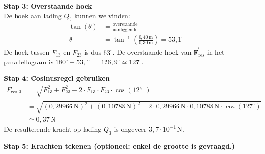 \documentclass{ximera}
\begin{document}
\begin{exercise}
\begin{solution}
\begin{center}
        \end{center}

    \textbf{Stap 3: Overstaande hoek}\\
        De hoek aan lading $Q_{3}$ kunnen we vinden:
        \begin{align*}
            \tan(\theta)&=\frac{\text{overstaande}}{\text{aanliggende}}\\
            \theta &=\tan^{-1}\left(\frac{0{,}40 \, \mathrm{m}}{0{,}30 \, \mathrm{m}}\right)= 53{,}1^\circ
        \end{align*}
        De hoek tussen $F_{13}$ en $F_{23}$ is dus $53^\circ$. De overstaande hoek van $\vec{\mathbf{F}}_{\text{res}}$ in het parallellogram is $180^\circ - 53{,}1^\circ = 126{,}9^\circ \simeq 127^\circ$.

    \textbf{Stap 4: Cosinusregel gebruiken}  
        \begin{align*}
            F_{\text{res},3} &= \sqrt{F_{13}^{2} + F_{23}^{2} - 2 \cdot F_{13} \cdot F_{23}\cdot \cos(127^\circ)}\\
            &= \sqrt{(0{,}29966 \, \mathrm{N})^{2}+(0{,}10788 \, \mathrm{N})^{2}-2\cdot 0{,}29966 \, \mathrm{N} \cdot 0{,}10788 \, \mathrm{N} \cdot \cos(127^\circ)}\\
            &\simeq 0{,}37 \, \mathrm{N}
        \end{align*}
        De resulterende kracht op lading $Q_{3}$ is ongeveer $3{,}7 \cdot 10^{-1} \, \mathrm{N}$.

    \textbf{Stap 5: Krachten tekenen (optioneel: enkel de grootte is gevraagd.)}


\end{solution}
\end{exercise}
\end{document}
